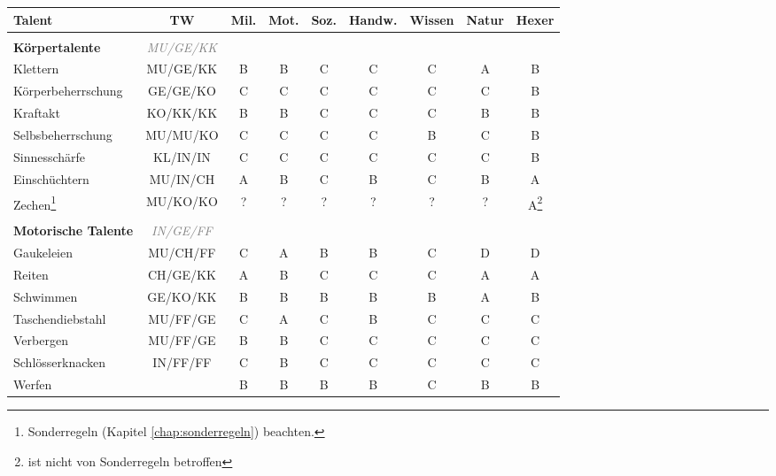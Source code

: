 \begin{center}
\begin{longtable}{|l|c|c|c|c|c|c|c|c|}
\hline
Talent & TW & Mil. & Mot. & Soz. & Handw. & Wissen & Natur & Hexer \\

\hline
\multicolumn{9}{|l|}{} \\
\multicolumn{1}{|l}{\textbf{Körpertalente}} & \multicolumn{1}{c}{\textcolor{gray}{\textit{MU/GE/KK}}} & \multicolumn{7}{r|}{} \\
\hline
Klettern & MU/GE/KK & B & B & C & C & C & A & B \\
\hline
Körperbeherrschung & GE/GE/KO & C & C & C & C & C & C & B \\
\hline
Kraftakt & KO/KK/KK & B & B & C & C & C & B & B \\
\hline
Selbsbeherrschung & MU/MU/KO & C & C & C & C & B & C & B \\
\hline
Sinnesschärfe & KL/IN/IN & C & C & C & C & C & C & B \\
\hline
Einschüchtern & MU/IN/CH & A & B & C & B & C & B & A \\
\hline
Zechen\footnote{Sonderregeln (Kapitel \ref{chap:sonderregeln}) beachten.} & MU/KO/KO & ? & ? & ? & ? & ? & ? & A\footnote{ist nicht von Sonderregeln betroffen} \\


\hline
\multicolumn{9}{|l|}{} \\
\multicolumn{1}{|l}{\textbf{Motorische Talente}} & \multicolumn{1}{c}{\textcolor{gray}{\textit{IN/GE/FF}}} & \multicolumn{7}{r|}{} \\
\hline
Gaukeleien & MU/CH/FF & C & A & B & B & C & D & D \\
\hline
Reiten & CH/GE/KK & A & B & C & C & C & A & A \\
\hline
Schwimmen & GE/KO/KK & B & B & B & B & B & A & B \\
\hline
Taschendiebstahl & MU/FF/GE & C & A & C & B & C & C & C \\
\hline
Verbergen & MU/FF/GE & B & B & C & C & C & C & C \\
\hline
Schlösserknacken & IN/FF/FF & C & B & C & C & C & C & C \\
\hline
Werfen\footnotemark[3] & & B & B & B & B & C & B & B \\
 


\end{longtable}
\end{center}
